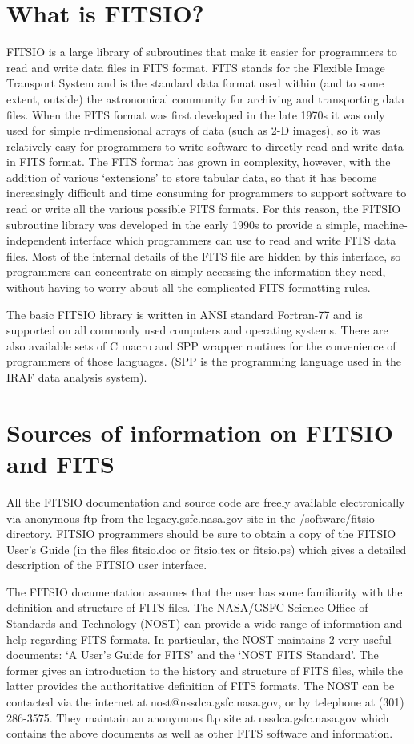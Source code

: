 \section{What is FITSIO?}

FITSIO is a large library of subroutines that make it easier for
programmers to read and write data files in FITS format.  FITS stands
for the Flexible Image Transport System and is the standard data format
used within (and to some extent, outside) the astronomical community
for archiving and transporting data files.  When the FITS format was
first developed in the late 1970s it was only used for simple
n-dimensional arrays of data (such as  2-D images), so it was
relatively easy for programmers to write software to directly read and
write data in FITS format.  The FITS format has grown in complexity,
however, with the addition of various `extensions' to store tabular
data, so that it has become increasingly difficult and time consuming
for programmers to support software to read or write all the various
possible FITS formats. For this reason, the FITSIO subroutine library
was developed in the early 1990s to provide a simple,
machine-independent interface which programmers can use to read and
write FITS data files.  Most of the internal details of the FITS file
are hidden by this interface, so programmers can concentrate on simply
accessing the information they need, without having to worry about all
the complicated FITS formatting rules.

The basic FITSIO library is written in ANSI standard Fortran-77 and is
supported on all commonly used computers and operating systems.  There
are also available sets of C macro and SPP wrapper routines for the
convenience of programmers of those languages. (SPP is the programming
language used in the IRAF data analysis system).

\section{Sources of information on FITSIO and FITS}

All the FITSIO documentation and source code are freely available
electronically via anonymous ftp from the legacy.gsfc.nasa.gov site in
the /software/fitsio directory.  FITSIO programmers should  be sure to
obtain a copy of the FITSIO User's Guide (in the files fitsio.doc or
fitsio.tex or fitsio.ps) which gives a detailed description of the
FITSIO user interface.

The FITSIO documentation assumes that the user has some familiarity
with the definition and structure of FITS files.  The NASA/GSFC Science
Office of Standards and Technology (NOST) can provide a wide range of
information and help regarding FITS formats.  In particular, the NOST
maintains 2 very useful documents:  `A User's Guide for FITS' and the
`NOST FITS Standard'.  The former gives an introduction to the history
and structure of FITS files, while the latter provides the
authoritative definition of FITS formats.  The NOST can be contacted
via the internet at nost@nssdca.gsfc.nasa.gov, or by telephone at (301)
286-3575.  They maintain an anonymous ftp site at
nssdca.gsfc.nasa.gov which contains the above documents as well as
other FITS software and information.

